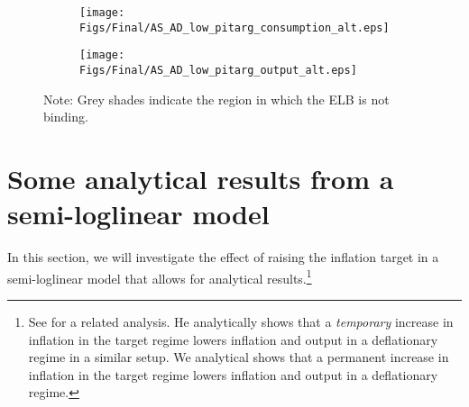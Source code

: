 \documentclass[11pt]{article}
\begin{document}
\begin{singlespace}
		\begin{figure}[H]
			\caption{AD and AS Curves in the Deflationary Regime\\---Low $\Pi^{targ}$---} \label{fig:ASAD_low_pitarg}
	        \vspace{-1em}
			\begin{center}
				\begin{subfigure}[b]{0.4\textwidth}
					\centering
					\texttt{[image: Figs/Final/AS\_AD\_low\_pitarg\_consumption\_alt.eps]}
				\end{subfigure}
				\hspace{0.5cm}
				\begin{subfigure}[b]{0.4\textwidth}
					\centering
					\texttt{[image: Figs/Final/AS\_AD\_low\_pitarg\_output\_alt.eps]}
				\end{subfigure}
			\end{center}
	        \vspace{-1em}
			{\footnotesize Note: Grey shades indicate the region in which the ELB is not binding.}
		\end{figure}

		\section{Some analytical results from a semi-loglinear model}
		\label{A:SemiLoglinearModel}

		In this section, we will investigate the effect of raising the inflation target in a semi-loglinear model that allows for analytical results.\footnote{See \citet{Bilbiie2018} for a related analysis. He analytically shows that a \textit{temporary} increase in inflation in the target regime lowers inflation and output in a deflationary regime in a similar setup. We analytical shows that a permanent increase in inflation in the target regime lowers inflation and output in a deflationary regime.}


\end{singlespace}
\end{document}

